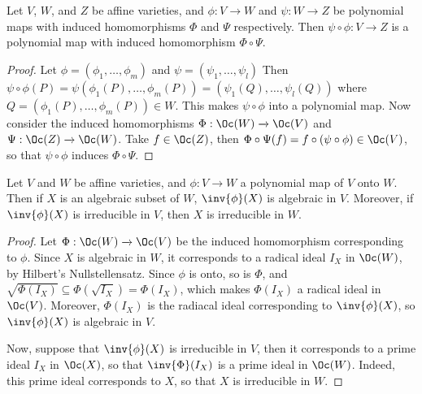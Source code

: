 \begin{lemma}\label{lemma_2.1.8}
  Let $V$, $W$, and $Z$ be affine varieties, and  $\phi:V \xrightarrow{} W$
  and $\psi:W \xrightarrow{} Z$ be polynomial maps with induced homomorphisms
  $\Phi$ and  $\Psi$ respectively. Then  $\psi \circ \phi:V \xrightarrow{} Z$ is
  a polynomial map with induced homomorphism $\Phi \circ \Psi$.
\end{lemma}
\begin{proof}
  Let $\phi=(\phi_1, \dots, \phi_m)$ and $\psi=(\psi_1, \dots, \psi_l)$ Then
  $\psi \circ \phi(P)=\psi(\phi_1(P), \dots, \phi_m(P))=(\psi_1(Q), \dots,
  \psi_l(Q))$ where $Q=(\phi_1(P), \dots, \phi_m(P)) \in W$. This makes $\psi
  \circ \phi$ into a polynomial map. Now consider the induced homomorphisms
  $\Phi:\Oc(W) \xrightarrow{} \Oc(V)$ and $\Psi:\Oc(Z) \xrightarrow{} \Oc(W)$.
  Take $f \in \Oc(Z)$, then $\Phi \circ \Psi(f)=f \circ (\psi \circ \phi) \in
  \Oc(V)$, so that $\psi \circ \phi$ induces  $\Phi \circ \Psi$.
\end{proof}

\begin{lemma}\label{lemma_2.1.9}
  Let $V$ and  $W$ be affine varieties, and  $\phi:V \xrightarrow{} W$ a
  polynomial map of $V$ onto $W$. Then if $X$ is an algebraic subset of  $W$,
  $\inv{\phi}(X)$ is algebraic in $V$. Moreover, if  $\inv{\phi}(X)$ is
  irreducible in $V$, then  $X$ is irreducible in  $W$.
\end{lemma}
\begin{proof}
  Let $\Phi:\Oc(W) \xrightarrow{} \Oc(V)$ be the induced homomorphism
  corresponding to $\phi$. Since  $X$ is algebraic in  $W$, it corresponds to a
  radical ideal $I_X$ in $\Oc(W)$, by Hilbert's Nullstellensatz. Since $\phi$ is
  onto, so is $\Phi$, and $\sqrt{\Phi(I_X)} \subseteq
  \Phi(\sqrt{I_X})=\Phi(I_X)$, which makes $\Phi(I_X)$ a radical ideal in
  $\Oc(V)$. Moreover, $\Phi(I_X)$ is the radiacal ideal corresponding to
  $\inv{\phi}(X)$, so $\inv{\phi}(X)$ is algebraic in $V$.

  Now, suppose that $\inv{\phi}(X)$ is irreducible in $V$, then it corresponds
  to a prime ideal $I_X$ in $\Oc(X)$, so that $\inv{\Phi}(I_X)$ is a prime ideal
  in $\Oc(W)$. Indeed, this prime ideal corresponds to $X$, so that $X$ is
  irreducible in $W$.
\end{proof}

